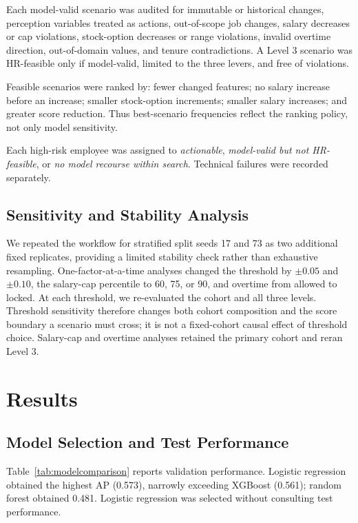 \documentclass[11pt]{article}
\begin{document}
Each model-valid scenario was audited for immutable or historical changes, perception variables treated as actions, out-of-scope job changes, salary decreases or cap violations, stock-option decreases or range violations, invalid overtime direction, out-of-domain values, and tenure contradictions. A Level 3 scenario was HR-feasible only if model-valid, limited to the three levers, and free of violations.

Feasible scenarios were ranked by: fewer changed features; no salary increase before an increase; smaller stock-option increments; smaller salary increases; and greater score reduction. Thus best-scenario frequencies reflect the ranking policy, not only model sensitivity.

Each high-risk employee was assigned to \emph{actionable}, \emph{model-valid but not HR-feasible}, or \emph{no model recourse within search}. Technical failures were recorded separately.

\subsection{Sensitivity and Stability Analysis}
We repeated the workflow for stratified split seeds 17 and 73 as two additional fixed replicates, providing a limited stability check rather than exhaustive resampling. One-factor-at-a-time analyses changed the threshold by $\pm0.05$ and $\pm0.10$, the salary-cap percentile to 60, 75, or 90, and overtime from allowed to locked. At each threshold, we re-evaluated the cohort and all three levels. Threshold sensitivity therefore changes both cohort composition and the score boundary a scenario must cross; it is not a fixed-cohort causal effect of threshold choice. Salary-cap and overtime analyses retained the primary cohort and reran Level 3.

\section{Results}
\subsection{Model Selection and Test Performance}
Table~\ref{tab:modelcomparison} reports validation performance. Logistic regression obtained the highest AP (0.573), narrowly exceeding XGBoost (0.561); random forest obtained 0.481. Logistic regression was selected without consulting test performance.
\end{document}
